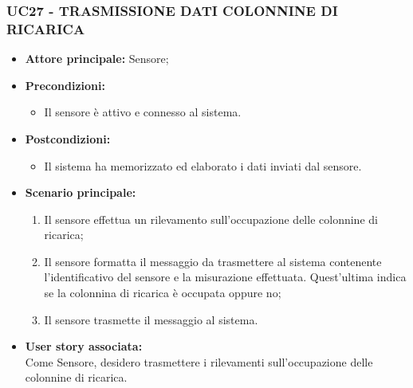 \subsubsection{UC27 - TRASMISSIONE DATI COLONNINE DI RICARICA}
\begin{itemize}
    \item \textbf{Attore principale:} Sensore;
    \item \textbf{Precondizioni:}
        \begin{itemize}
            \item Il sensore è attivo e connesso al sistema. 
        \end{itemize}
    \item \textbf{Postcondizioni:}
        \begin{itemize}
            \item Il sistema ha memorizzato ed elaborato i dati inviati dal sensore.
        \end{itemize}
    \item \textbf{Scenario principale:}
        \begin{enumerate}
            \item Il sensore effettua un rilevamento sull'occupazione delle colonnine di ricarica;
            \item Il sensore formatta il messaggio da trasmettere al sistema contenente l'identificativo del sensore e la misurazione effettuata. Quest'ultima indica se la colonnina di ricarica è occupata oppure no;
            \item Il sensore trasmette il messaggio al sistema.
        \end{enumerate}
    \item \textbf{User story associata:} \\
    Come Sensore, desidero trasmettere i rilevamenti sull'occupazione delle colonnine di ricarica.
\end{itemize}